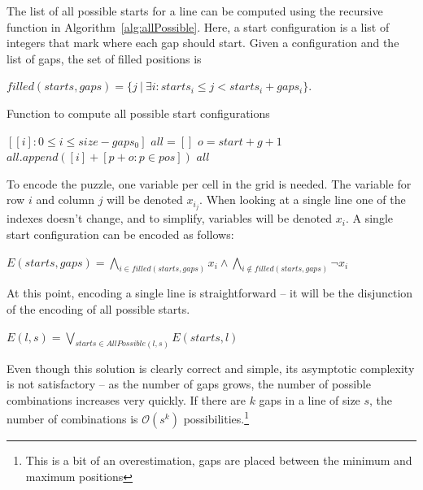 \documentclass[12pt]{article}
\begin{document}
The list of all possible starts for a line can be computed using the recursive function in Algorithm~\ref{alg:allPossible}.
Here, a start configuration is a list of integers that mark where each gap should start.
Given a configuration and the list of gaps, the set of filled positions is

\begin{center}
  $filled(starts, gaps) = \{j\ |\ \exists i: starts_i \le j < starts_i + gaps_i\}$.
\end{center}

\begin{algorithm}
\caption{Function to compute all possible start configurations}\label{alg:allPossible}
\begin{algorithmic}
    \State\Return$[ [i]: 0 \le i \le size - gaps_0]$
  \Else
    \State$all = []$
      \State$o = start + g + 1$ 
          \State $all.append([i] + [p + o: p \in pos])$
      \EndFor
    \EndFor
    \State \Return $all$
  \EndIf
\EndFunction
\end{algorithmic}
\end{algorithm}

To encode the puzzle, one variable per cell in the grid is needed.
The variable for row $i$ and column $j$ will be denoted $x_i_j$.
When looking at a single line one of the indexes doesn't change, and to simplify, variables will be denoted $x_i$.
A single start configuration can be encoded as follows:

\begin{center}
  $E(starts, gaps) = \bigwedge\limits_{i \in filled(starts, gaps)}x_i \wedge \bigwedge\limits_{i \notin filled(starts, gaps)} \neg x_i$
\end{center}

At this point, encoding a single line is straightforward -- it will be the disjunction of the encoding of all possible starts.

\begin{center}
  $E(l, s) = \bigvee_{starts \in AllPossible(l, s)} E(starts, l)$
\end{center}

Even though this solution is clearly correct and simple, its asymptotic complexity is not satisfactory -- as the number of gaps grows, the number of possible combinations increases very quickly.
If there are $k$ gaps in a line of size $s$, the number of combinations is $\mathcal{O}(s^k)$ possibilities.\footnote{This is a bit of an overestimation, gaps are placed between the minimum and maximum positions}
\end{document}
